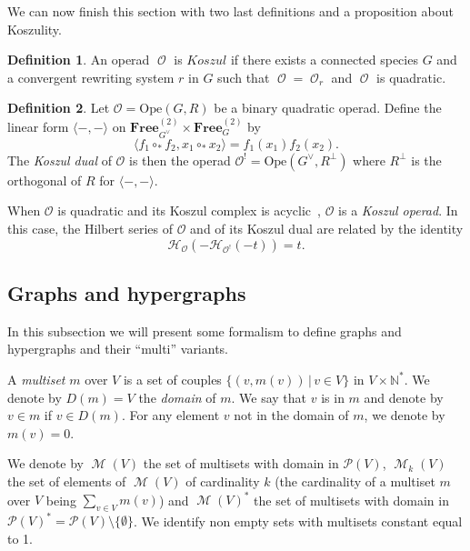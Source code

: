 \documentclass[a4paper]{article}
\DeclareMathOperator{\m}{\mathcal{M}}
\DeclareMathOperator{\op}{\mathcal{O}}
\theoremstyle{definition}
\newtheorem{definition}{Definition}
\newcommand{\Operad}{\mathcal{O}}
\newcommand{\Ope}{\mathrm{Ope}}
\newcommand{\FreeOp}{\mathbf{Free}}
\newcommand{\p}{\mathcal{P}}
\begin{document}
We can now finish this section with two last definitions and a proposition about Koszulity.


\begin{definition}
An operad $\op$ is $\textit{Koszul}$ if there exists a connected species $G$ and 
a convergent rewriting system $r$ in $G$ such that $\op = \op_r$ and $\op$ is quadratic.
\end{definition}

\begin{definition}
Let $\Operad =\Ope(G,R)$ be a binary quadratic operad. Define the linear form
$\langle -, -\rangle$ on $\FreeOp_{G^{\vee}}^{(2)}\times\FreeOp_{G}^{(2)}$ by
\begin{equation}
    \langle f_1\circ_{\ast} f_2 , x_1\circ_{\ast} x_2 \rangle = f_1(x_1)f_2(x_2).
\end{equation}
The \textit{Koszul dual} of $\Operad$ is then the operad $\Operad^!=\Ope(G^{\vee},R^{\bot})$
where $R^{\bot}$ is the orthogonal of $R$ for $\langle -,-\rangle$.
\end{definition}

When $\Operad$ is quadratic and its Koszul complex is acyclic~\cite{LV12}, $\Operad$ is
a \textit{Koszul operad}. In this case, the Hilbert series of $\Operad$ and of its Koszul
dual are related by the identity
\begin{equation} \label{hdual}
    \mathcal{H}_{\Operad}(-\mathcal{H}_{\Operad^!}(-t)) = t.
\end{equation}



\subsection{Graphs and hypergraphs}
\label{graph}
In this subsection we will present some formalism to define graphs and hypergraphs and 
their ``multi'' variants.

A \textit{multiset} $m$ over $V$ is a set of couples $\{(v,m(v))\,|\, v\in V\}$ in 
$V\times\mathbb{N}^*$. We denote by $D(m)=V$ the {\em domain} of $m$. We say that 
$v$ is in $m$ and denote by $v\in m$ if $v\in D(m)$. For any element $v$ not in 
the domain of $m$, we denote by $m(v) = 0$.

We denote by $\m(V)$ the set of multisets with domain in $\p(V)$, $\m_k(V)$ the set 
of elements of $\m(V)$ of cardinality $k$ (the cardinality of a multiset $m$ over 
$V$ being $\sum_{v\in V} m(v)$) and $\m(V)^*$ the set of multisets with domain in 
$\p(V)^* = \p(V)\setminus\{\emptyset\}$. We identify non empty sets with multisets 
constant equal to 1.
\end{document}
